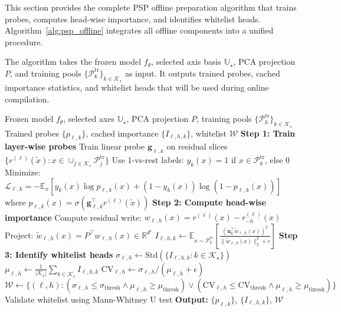 This section provides the complete PSP offline preparation algorithm that trains probes, computes head-wise importance, and identifies whitelist heads.
Algorithm~\ref{alg:psp_offline} integrates all offline components into a unified procedure.

The algorithm takes the frozen model $f_\theta$, selected axis basis $\mathbb{U}_\star$, PCA projection $P$, and training pools $\{\mathcal{P}_k^{\mathrm{tr}}\}_{k\in\mathcal{K}_\star}$ as input.
It outputs trained probes, cached importance statistics, and whitelist heads that will be used during online compilation.

\FloatBarrier
\begin{algorithm*}[!t]
\caption{PSP Offline Preparation}
\label{alg:psp_offline}
\begin{algorithmic}[1]
\REQUIRE Frozen model $f_\theta$, selected axes $\mathbb{U}_\star$, PCA projection $P$, training pools $\{\mathcal{P}_k^{\mathrm{tr}}\}_{k\in\mathcal{K}_\star}$
\ENSURE Trained probes $\{p_{\ell,k}\}$, cached importance $\{I_{\ell,h,k}\}$, whitelist $\mathcal{W}$
\STATE \textbf{Step 1: Train layer-wise probes}
        \STATE Train linear probe $\mathbf{g}_{\ell,k}$ on residual slices $\{r^{(\ell)}(\tilde{x}): x \in \cup_{j\in\mathcal{K}_\star} \mathcal{P}_j^{\mathrm{tr}}\}$
        \STATE Use 1-vs-rest labels: $y_k(x) = 1$ if $x \in \mathcal{P}_k^{\mathrm{tr}}$, else $0$
        \STATE Minimize: $\mathcal{L}_{\ell,k} = -\mathbb{E}_x [y_k(x)\log p_{\ell,k}(x) + (1-y_k(x))\log(1-p_{\ell,k}(x))]$
        \STATE where $p_{\ell,k}(x) = \sigma(\mathbf{g}_{\ell,k}^\top r^{(\ell)}(\tilde{x}))$
    \ENDFOR
\ENDFOR
\STATE \textbf{Step 2: Compute head-wise importance}
                \STATE Compute residual write: $w_{\ell,h}(x) = r^{(\ell)}(x) - r^{(\ell)}_{-h}(x)$
                \STATE Project: $\tilde{w}_{\ell,h}(x) = P^\top w_{\ell,h}(x) \in \mathbb{R}^{d'}$
            \ENDFOR
            \STATE $I_{\ell,h,k} \leftarrow \mathbb{E}_{x \sim \mathcal{P}_k^{\mathrm{tr}}} \left[ \frac{(\mathbf{u}_k^\top \tilde{w}_{\ell,h}(x))^2}{\|\tilde{w}_{\ell,h}(x)\|_2^2 + \epsilon} \right]$
        \ENDFOR
    \ENDFOR
\ENDFOR
\STATE \textbf{Step 3: Identify whitelist heads}
    \STATE $\sigma_{\ell,h} \leftarrow \mathrm{Std}(\{I_{\ell,h,k}: k \in \mathcal{K}_\star\})$
    \STATE $\mu_{\ell,h} \leftarrow \frac{1}{|\mathcal{K}_\star|} \sum_{k \in \mathcal{K}_\star} I_{\ell,h,k}$
    \STATE $\mathrm{CV}_{\ell,h} \leftarrow \sigma_{\ell,h} / (\mu_{\ell,h} + \epsilon)$
\ENDFOR
\STATE $\mathcal{W} \leftarrow \{(\ell,h): (\sigma_{\ell,h} \leq \sigma_{\mathrm{thresh}} \land \mu_{\ell,h} \geq \mu_{\mathrm{thresh}}) \lor (\mathrm{CV}_{\ell,h} \leq \mathrm{CV}_{\mathrm{thresh}} \land \mu_{\ell,h} \geq \mu_{\mathrm{thresh}})\}$
\STATE Validate whitelist using Mann-Whitney U test
\STATE \textbf{Output:} $\{p_{\ell,k}\}$, $\{I_{\ell,h,k}\}$, $\mathcal{W}$
\end{algorithmic}
\end{algorithm*}

